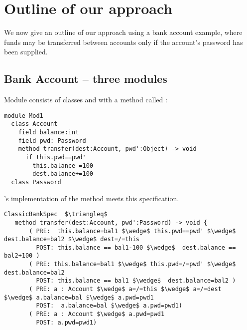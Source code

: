 

\section{Outline of our approach}
\label{s:outline}
We now give an outline of our approach using a bank account example,   where funds may be transferred between accounts only if the account's password has been supplied.


 \subsection{Bank Account -- three modules}
\label{s:bank}
  
Module    consists   of classes   and  
with a method called :
%
%
%
%
% 
\begin{lstlisting}[language=Chainmail, frame=lines]
module Mod1
  class Account
    field balance:int 
    field pwd: Password
    method transfer(dest:Account, pwd':Object) -> void
      if this.pwd==pwd'
        this.balance-=100
        dest.balance+=100
  class Password
\end{lstlisting}
%
\noindent 
{}
's implementation of the  method meets
this specification.



\begin{lstlisting}[mathescape=true, frame=lines, language=Chainmail]
ClassicBankSpec  $\triangleq$
   method transfer(dest:Account, pwd':Password) -> void {
       ( PRE:  this.balance=bal1 $\wedge$ this.pwd==pwd' $\wedge$ dest.balance=bal2 $\wedge$ dest=/=this 
         POST: this.balance == bal1-100 $\wedge$  dest.balance == bal2+100 )
       ( PRE: this.balance=bal1 $\wedge$ this.pwd=/=pwd' $\wedge$ dest.balance=bal2
         POST: this.balance == bal1 $\wedge$  dest.balance=bal2 )
       ( PRE: a : Account $\wedge$ a=/=this $\wedge$ a=/=dest  $\wedge$ a.balance=bal $\wedge$ a.pwd=pwd1
         POST:  a.balance=bal $\wedge$ a.pwd=pwd1)
       ( PRE: a : Account $\wedge$ a.pwd=pwd1  
         POST: a.pwd=pwd1)       
\end{lstlisting}
 
